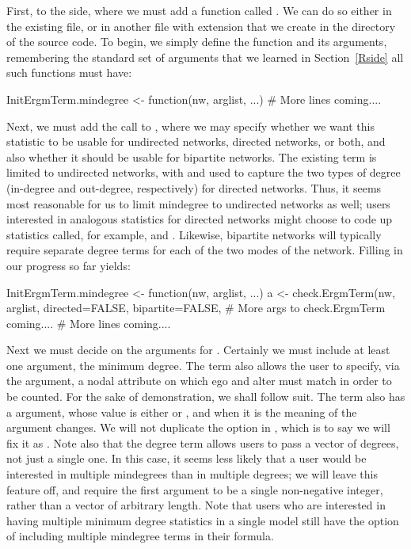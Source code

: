 \documentclass[nojss]{jss}
\begin{document}
First, to the  side, where we must add a function called .  We can do so either in the existing  file, or in another file with extension  that we create in the  directory of the  source code. To begin, we simply define the function and its arguments, remembering the standard set of arguments that we learned in Section~\ref{Rside} all such functions must have:
\begin{CodeChunk}
\begin{CodeInput}
InitErgmTerm.mindegree <- function(nw, arglist, ...) {
  # More lines coming....
}
\end{CodeInput}
\end{CodeChunk}

Next, we must add the call to , where we may specify
whether we want this statistic to be usable for undirected networks,
directed networks, or both, and also whether it should be usable for bipartite networks.
The existing  term  is limited to undirected networks, with  and  used to capture the two types of degree (in-degree and out-degree, respectively) for directed networks. Thus, it seems most reasonable for us to limit mindegree to undirected networks as well; users interested in analogous statistics for directed networks might choose to code up statistics called, for example,  and . Likewise, bipartite networks will typically require separate degree terms for each of the two modes of the network.
Filling in our progress so far yields:
\begin{CodeChunk}
\begin{CodeInput}
InitErgmTerm.mindegree <- function(nw, arglist, ...) {
  a <- check.ErgmTerm(nw, arglist, directed=FALSE, bipartite=FALSE,
    # More args to check.ErgmTerm coming....
  # More lines coming....
}
\end{CodeInput}
\end{CodeChunk}
Next we must decide on the arguments for .  Certainly we must include at least one argument, the minimum degree.  The  term also allows the user to specify, via the  argument, a nodal attribute on which ego and alter must match in order to be counted. 
For the sake of demonstration, we shall follow suit.  The  term also has a 
argument, whose value is either  or , and when it is
 the meaning of the  argument changes.  We will not
duplicate the  option in ,
which is to say we will fix it as .
Note also that the degree term allows users to pass a vector of degrees, not just a single one.  In this case, it seems less likely that a user would be interested in multiple mindegrees than in multiple degrees; we will leave this feature off, and require the first argument to be a single non-negative integer, rather than a vector of arbitrary length.  Note that users who are interested in having multiple minimum degree statistics in a single model still have the option of including multiple mindegree terms in their formula.
\end{document}

